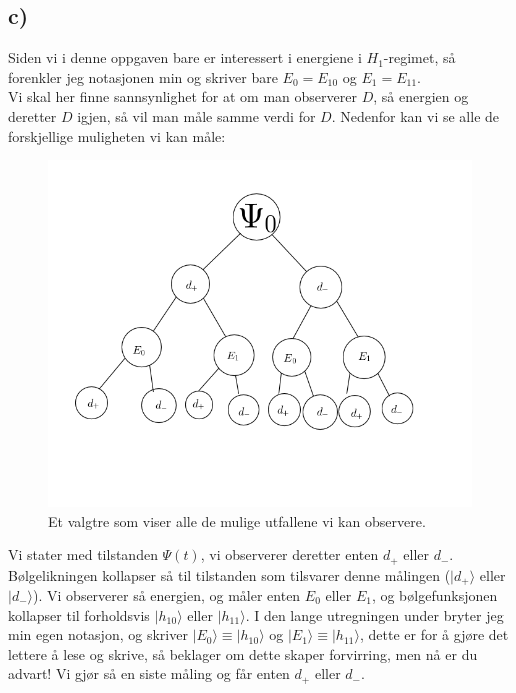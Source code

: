 \documentclass[a4paper,norsk, 10pt]{article}
\numberwithin{equation}{section}
\begin{document}
\subsection*{c)}

Siden vi i denne oppgaven bare er interessert i energiene i $H_1$-regimet, så forenkler jeg notasjonen min og skriver bare $E_0 = E_{10}$ og $E_1 = E_{11}$.\\

Vi skal her finne sannsynlighet for at om man observerer $D$, så energien og deretter $D$ igjen, så vil man måle samme verdi for $D$. Nedenfor kan vi se alle de forskjellige muligheten vi kan måle:

\begin{figure}[H]
\centering
\includegraphics[scale=0.6]{3c.png}
\caption{Et valgtre som viser alle de mulige utfallene vi kan observere.}
\end{figure}

Vi stater med tilstanden $\Psi(t)$, vi observerer deretter enten $d_+$ eller $d_-$. Bølgelikningen kollapser så til tilstanden som tilsvarer denne målingen ($|d_+\rangle$ eller $|d_-\rangle$). Vi observerer så energien, og måler enten $E_0$ eller $E_1$, og bølgefunksjonen kollapser til forholdsvis $|h_{10}\rangle$ eller $|h_{11}\rangle$. I den lange utregningen under bryter jeg min egen notasjon, og skriver $|E_0\rangle \equiv |h_{10}\rangle $ og $|E_1\rangle \equiv |h_{11}\rangle $, dette er for å gjøre det lettere å lese og skrive, så beklager om dette skaper forvirring, men nå er du advart! Vi gjør så en siste måling og får enten $d_+$ eller $d_-$.\\
\end{document}
